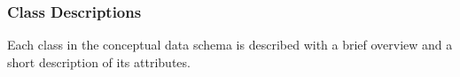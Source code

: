 \subsubsection{Class Descriptions}

Each class in the conceptual data schema is described with a brief overview and a short description of its attributes.






